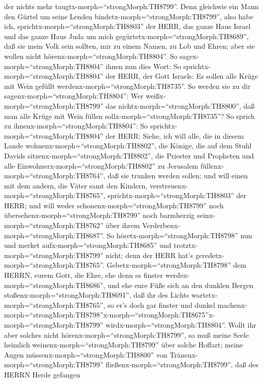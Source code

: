 der nichts mehr taugtx-morph=``strongMorph:TH8799''.  Denn
gleichwie ein Mann den Gürtel um seine Lenden
bindetx-morph=``strongMorph:TH8799'', also habe ich,
sprichtx-morph=``strongMorph:TH8803'' der HERR, das ganze Haus Israel
und das ganze Haus Juda um mich gegürtetx-morph=``strongMorph:TH8689'',
daß sie mein Volk sein sollten, mir zu einem Namen, zu Lob und Ehren;
aber sie wollen nicht hörenx-morph=``strongMorph:TH8804''. 
So sagex-morph=``strongMorph:TH8804'' ihnen nun dies Wort: So
sprichtx-morph=``strongMorph:TH8804'' der HERR, der Gott Israels: Es
sollen alle Krüge mit Wein gefüllt werdenx-morph=``strongMorph:TH8735''.
So werden sie zu dir sagenx-morph=``strongMorph:TH8804'': Wer
weißx-morph=``strongMorph:TH8799'' das
nichtx-morph=``strongMorph:TH8800'', daß man alle Krüge mit Wein füllen
sollx-morph=``strongMorph:TH8735''?  So sprich zu
ihnenx-morph=``strongMorph:TH8804'': So
sprichtx-morph=``strongMorph:TH8804'' der HERR: Siehe, ich will alle,
die in diesem Lande wohnenx-morph=``strongMorph:TH8802'', die Könige,
die auf dem Stuhl Davids sitzenx-morph=``strongMorph:TH8802'', die
Priester und Propheten und alle Einwohnerx-morph=``strongMorph:TH8802''
zu Jerusalem füllenx-morph=``strongMorph:TH8764'', daß sie trunken
werden sollen;  und will einen mit dem andern, die Väter
samt den Kindern, verstreuenx-morph=``strongMorph:TH8765'',
sprichtx-morph=``strongMorph:TH8803'' der HERR; und will weder
schonenx-morph=``strongMorph:TH8799'' noch
übersehenx-morph=``strongMorph:TH8799'' noch barmherzig
seinx-morph=``strongMorph:TH8762'' über ihrem
Verderbenx-morph=``strongMorph:TH8687''.  So
höretx-morph=``strongMorph:TH8798'' nun und merket
aufx-morph=``strongMorph:TH8685'' und
trotztx-morph=``strongMorph:TH8799'' nicht; denn der HERR hat's
geredetx-morph=``strongMorph:TH8765''. 
Gebetx-morph=``strongMorph:TH8798'' dem HERRN, eurem Gott, die Ehre, ehe
denn es finster werdex-morph=``strongMorph:TH8686'', und ehe eure Füße
sich an den dunklen Bergen stoßenx-morph=``strongMorph:TH8691'', daß ihr
des Lichts wartetx-morph=``strongMorph:TH8765'', so er's doch gar
finster und dunkel
machenx-morph=``strongMorph:TH8798''\textbar x-morph=``strongMorph:TH8675''x-morph=``strongMorph:TH8799''
wirdx-morph=``strongMorph:TH8804''.  Wollt ihr aber solches
nicht hörenx-morph=``strongMorph:TH8799'', so muß meine Seele heimlich
weinenx-morph=``strongMorph:TH8799'' über solche Hoffart; meine Augen
müssenx-morph=``strongMorph:TH8800'' von
Tränenx-morph=``strongMorph:TH8799''
fließenx-morph=``strongMorph:TH8799'', daß des HERRN Herde gefangen
